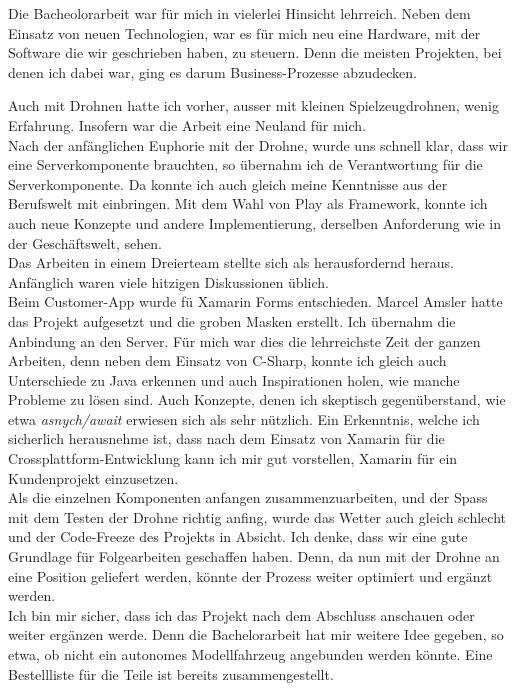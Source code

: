 Die Bacheolorarbeit war für mich in vielerlei Hinsicht lehrreich. 
Neben dem Einsatz von neuen Technologien, war es für mich neu eine Hardware, mit der Software die wir geschrieben haben, zu steuern.
Denn die meisten Projekten, bei denen ich dabei war, ging es darum Business-Prozesse abzudecken.

Auch mit Drohnen hatte ich vorher, ausser mit kleinen Spielzeugdrohnen, wenig Erfahrung. Insofern war die Arbeit eine Neuland für mich.
\\
Nach der anfänglichen Euphorie mit der Drohne, wurde uns schnell klar, dass wir eine Serverkomponente brauchten, so übernahm ich de Verantwortung für die Serverkomponente. 
Da konnte ich auch gleich meine Kenntnisse aus der Berufswelt mit einbringen. 
Mit dem Wahl von Play als Framework, konnte ich auch neue Konzepte und andere Implementierung, derselben Anforderung wie in der Geschäftswelt, sehen. 
\\
Das Arbeiten in einem Dreierteam stellte sich als herausfordernd heraus. Anfänglich waren viele hitzigen Diskussionen üblich. 
\\
Beim Customer-App wurde fü Xamarin Forms entschieden.
Marcel Amsler hatte das Projekt aufgesetzt und die groben Masken erstellt. Ich übernahm die Anbindung an den Server.
Für mich war dies die lehrreichste Zeit der ganzen Arbeiten, denn neben dem Einsatz von C-Sharp, konnte ich gleich auch Unterschiede zu Java erkennen und auch Inspirationen holen, wie manche Probleme zu lösen sind. Auch Konzepte, denen ich skeptisch gegenüberstand, wie etwa \textit{asnych/await} erwiesen sich als sehr nützlich. Ein Erkenntnis, welche ich sicherlich herausnehme ist, dass nach dem Einsatz von Xamarin für die Crossplattform-Entwicklung kann ich mir gut vorstellen, Xamarin für ein Kundenprojekt einzusetzen. 
\\
Als die einzelnen Komponenten anfangen zusammenzuarbeiten, und der Spass mit dem Testen der Drohne richtig anfing, wurde das Wetter auch gleich schlecht und der Code-Freeze des Projekts in Absicht. Ich denke, dass wir eine gute Grundlage für Folgearbeiten geschaffen haben. Denn, da nun mit der Drohne an eine Position geliefert werden, könnte der Prozess weiter optimiert und ergänzt werden. 
\\
Ich bin mir sicher, dass ich das Projekt nach dem Abschluss anschauen oder weiter ergänzen werde. Denn die Bachelorarbeit hat mir weitere Idee gegeben, so etwa, ob nicht ein autonomes Modellfahrzeug angebunden werden könnte. Eine Bestellliste für die Teile ist bereits zusammengestellt.




